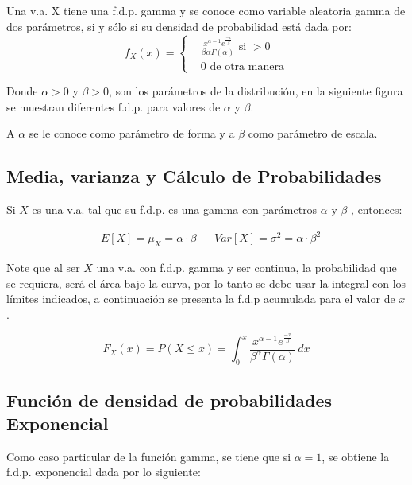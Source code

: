 \begin{definition}[f.d.p. gamma]
    Una v.a. X tiene una f.d.p. gamma y se conoce como variable aleatoria gamma de dos parámetros, si y sólo si su densidad de probabilidad está dada por:
    \begin{equation}
        f_X( x )=\begin{cases}
             & \frac{x^{\alpha-1}e^{\frac{-x}{\beta}}}{\beta \alpha \Gamma (\alpha )}\text{ si }>0 \\
             & 0 \text{ de otra manera}
        \end{cases}
    \end{equation}
\end{definition}

Donde $\alpha >0$ y $\beta >0$, son los parámetros de la
distribución, en la siguiente figura se muestran
diferentes f.d.p. para valores de $\alpha$  y $\beta$.

A $\alpha$  se le conoce como parámetro
de forma y a $\beta$  como parámetro de
escala.


\subsection{Media, varianza y Cálculo de Probabilidades}

Si $X$ es una v.a. tal que su f.d.p. es una gamma con parámetros
$\alpha$  y $\beta$ , entonces:

\begin{align*}
     & E\left[X\right] =\mu_X=\alpha \cdot \beta &  & Var\left[X\right] =\sigma^2=\alpha \cdot \beta^2
\end{align*}

Note que al ser $X$ una v.a. con f.d.p. gamma y ser continua, la
probabilidad que se requiera, será el área bajo la curva, por lo
tanto se debe usar la integral con los límites indicados, a continuación se presenta la f.d.p acumulada para el valor de $x$.

\begin{equation}
    F_X( x )=P(X\leq x )=\int_0^x \frac{x^{\alpha-1}e^{\frac{-x}{\beta}}}{\beta^{\alpha}\Gamma (\alpha )}\, dx
\end{equation}

\subsection{Función de densidad de probabilidades Exponencial}

Como caso particular de la función gamma, se tiene que
si $\alpha=1$, se obtiene la f.d.p. exponencial dada por lo
siguiente:

